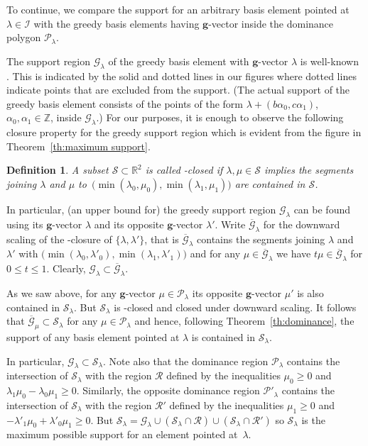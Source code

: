 \documentclass[pdflatex,sn-mathphys]{sn-jnl}%
\theoremstyle{thmstyleone}%
\theoremstyle{thmstyletwo}%
\theoremstyle{thmstylethree}%
\newtheorem{definition}[theorem]{Definition}
\newcommand{\bfg}{\boldsymbol{g}}
\newcommand{\cG}{\mathcal{G}}
\newcommand{\cI}{\mathcal{I}}
\newcommand{\cP}{\mathcal{P}}
\newcommand{\cR}{\mathcal{R}}
\newcommand{\cS}{\mathcal{S}}
\newcommand{\RR}{\mathbb{R}}
\newcommand{\ZZ}{\mathbb{Z}}
\begin{document}
  To continue, we compare the support for an arbitrary basis element pointed at $\lambda\in\cI$ with the greedy basis elements having $\bfg$-vector inside the dominance polygon $\cP_\lambda$.

  The support region $\cG_\lambda$ of the greedy basis element with $\bfg$-vector $\lambda$ is well-known \cite{CGMMRSW17,LLZ14}.
  This is indicated by the solid and dotted lines in our figures where dotted lines indicate points that are excluded from the support.
  (The actual support of the greedy basis element consists of the points of the form $\lambda+(b \alpha_0 ,c \alpha_1)$, $\alpha_0,\alpha_1\in\ZZ$, inside $\cG_\lambda$.)
  For our purposes, it is enough to observe the following closure property for the greedy support region which is evident from the figure in Theorem~\ref{th:maximum support}.
  \begin{definition}
    A subset $\cS\subset\RR^2$ is called \scalebox{1.7}{$\llcorner$}-closed if $\lambda,\mu\in\cS$ implies the segments joining $\lambda$ and $\mu$ to~$\big(\!\min(\lambda_0,\mu_0),\min(\lambda_1,\mu_1)\big)$ are contained in $\cS$.
  \end{definition}
  In particular, (an upper bound for) the greedy support region $\cG_\lambda$ can be found using its $\bfg$-vector $\lambda$ %
  and its opposite $\bfg$-vector $\lambda'$. %
  Write $\overline{\cG}_\lambda$ for the downward scaling of the \scalebox{1.7}{$\llcorner$}-closure of $\{\lambda,\lambda'\}$, that is $\overline{\cG}_\lambda$ contains the segments joining $\lambda$ and $\lambda'$ with $\big(\!\min(\lambda_0,\lambda'_0),\min(\lambda_1,\lambda'_1)\big)$ and for any $\mu\in\overline{\cG}_\lambda$ we have $t\mu\in\overline{\cG}_\lambda$ for $0\le t\le 1$.
  Clearly, $\cG_\lambda\subset\overline{\cG}_\lambda$.

  As we saw above, for any $\bfg$-vector $\mu\in\cP_\lambda$ its opposite $\bfg$-vector $\mu'$ is also contained in $\cS_\lambda$.
  But $\cS_\lambda$ is \scalebox{1.7}{$\llcorner$}-closed and closed under downward scaling. %
  It follows that $\overline{\cG}_\mu\subset\cS_\lambda$ for any $\mu\in\cP_\lambda$ and hence, following Theorem~\ref{th:dominance}, the support of any basis element pointed at $\lambda$ is contained in $\cS_\lambda$.

  In particular, $\cG_\lambda\subset\cS_\lambda$.
  Note also that the dominance region $\cP_\lambda$ contains the intersection of $\cS_\lambda$ with the region $\cR$ defined by the inequalities $\mu_0\ge0$ and $\lambda_1\mu_0-\lambda_0\mu_1\ge0$.
  Similarly, the opposite dominance region $\cP'_\lambda$ contains the intersection of $\cS_\lambda$ with the region $\cR'$ defined by the inequalities $\mu_1\ge0$ and $-\lambda'_1\mu_0+\lambda'_0\mu_1\ge0$.
  But $\cS_\lambda=\cG_\lambda\cup(\cS_\lambda\cap\cR)\cup(\cS_\lambda\cap\cR')$ so $\cS_\lambda$ is the maximum possible support for an element pointed at~$\lambda$.
\end{document}

